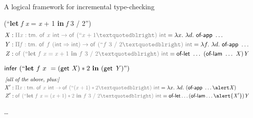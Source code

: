 \documentclass{beamer}
\theoremstyle{example}
\begin{document}
\begin{frame}{A logical framework for incremental type-checking}
  \begin{examples}

    \begin{description}[$\delta_{42} = $]
    \item[$\delta_0 = $]
       (“\textbf{let} \textit{f x} = \textit{x} + 1
      \textbf{in} \textit{f} 3 / 2”)
      \pause
      {\footnotesize
        \begin{align*}
          \mmeta &: \textcolor{gray}{\prd x {\const{tm}} {\const{of}}\ x\ \const{int}
          \to \const{of}\ (\text{“}x+1”)\ \const{int}} = \ulam x \ulam d
          \const{of-app}\ \ldots\\
          \mmmeta &: \textcolor{gray}{\prd f {\const{tm}} \const{of}\ f\
          (\const{int}\To\const{int}) \to \const{of}\ (\text{“}f\ 3\ /\ 2”)\
          \const{int}} = \ulam f \ulam d \const{of-app}\ \ldots\\
          \mmmmeta &: \textcolor{gray}{\const{of}\ (\text{“}\mathbf{let}\ \var f\ \var x = \var
          x + 1\ \mathbf{in}\ f\ 3\ /\ 2”)\ \const{int}} =
          \const{of-let}\ \ldots\ (\const{of-lam}\ \ldots\ \mmeta) \mmmeta
        \end{align*}}
      \pause
  \item[$\delta_1 = $]
    $
    \const{infer}\ (\text{“}\mathbf{let}\ f\ x\ = (\const{get}\ \mmeta) * 2\
    \mathbf{in}\ (\const{get}\ \mmmeta)\text{”})
    $
    \pause
    {\footnotesize
      \begin{align*}
        & \hspace{-1em}\text{\it [all of the above, plus:]} \\
        \mmeta' &: \textcolor{gray}{\prd x {\const{tm}} {\const{of}}\ x\ \const{int}
        \to \const{of}\ (\text{“}(x+1)*2”)\ \const{int}} = \ulam x \ulam d
        (\const{of-app}\ \ldots \alert\mmeta)\\
        \mmmmeta' &: \textcolor{gray}{\const{of}\ (\text{“}\mathbf{let}\ \var f\ \var x =
        (\var x + 1) * 2\ \mathbf{in}\ f\ 3\ /\ 2”)\ \const{int}} =
        \const{of-let}\ldots(\const{of-lam}\ldots\alert{\mmeta'}) \mmmeta
      \end{align*}
    }
    \pause
  \item[$\delta_2 =$] \ldots
    \end{description}
  \end{examples}
\end{frame}
\end{document}

